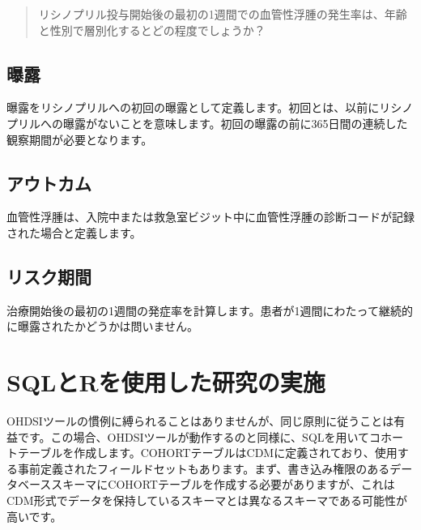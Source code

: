 \documentclass[
  11pt]{book}
\theoremstyle{definition}
\theoremstyle{definition}
\theoremstyle{definition}
\theoremstyle{definition}
\theoremstyle{remark}
\begin{document}
\begin{quote}
リシノプリル投与開始後の最初の1週間での血管性浮腫の発生率は、年齢と性別で層別化するとどの程度でしょうか？
\end{quote}

\subsection{曝露}\label{ux66ddux9732}

曝露をリシノプリルへの初回の曝露として定義します。初回とは、以前にリシノプリルへの曝露がないことを意味します。初回の曝露の前に365日間の連続した観察期間が必要となります。

\subsection{アウトカム}\label{ux30a2ux30a6ux30c8ux30abux30e0}

血管性浮腫は、入院中または救急室ビジット中に血管性浮腫の診断コードが記録された場合と定義します。

\subsection{リスク期間}\label{ux30eaux30b9ux30afux671fux9593}

治療開始後の最初の1週間の発症率を計算します。患者が1週間にわたって継続的に曝露されたかどうかは問いません。

\section{SQLとRを使用した研究の実施}\label{sqlux3068rux3092ux4f7fux7528ux3057ux305fux7814ux7a76ux306eux5b9fux65bd}

OHDSIツールの慣例に縛られることはありませんが、同じ原則に従うことは有益です。この場合、OHDSIツールが動作するのと同様に、SQLを用いてコホートテーブルを作成します。COHORTテーブルはCDMに定義されており、使用する事前定義されたフィールドセットもあります。まず、書き込み権限のあるデータベーススキーマにCOHORTテーブルを作成する必要がありますが、これはCDM形式でデータを保持しているスキーマとは異なるスキーマである可能性が高いです。
\end{document}
